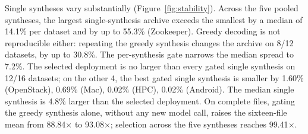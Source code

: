 Single syntheses vary substantially (Figure~\ref{fig:stability}). Across the five pooled syntheses, the largest single-synthesis archive exceeds the smallest by a median of 14.1\% per dataset and by up to 55.3\% (Zookeeper). Greedy decoding is not reproducible either: repeating the greedy synthesis changes the archive on 8/12 datasets, by up to 30.8\%. The per-synthesis gate narrows the median spread to 7.2\%. The selected deployment is no larger than every gated single synthesis on 12/16 datasets; on the other 4, the best gated single synthesis is smaller by 1.60\% (OpenStack), 0.69\% (Mac), 0.02\% (HPC), 0.02\% (Android). The median single synthesis is 4.8\% larger than the selected deployment. On complete files, gating the greedy synthesis alone, without any new model call, raises the sixteen-file mean from 88.84$\times$ to 93.08$\times$; selection across the five syntheses reaches 99.41$\times$.
